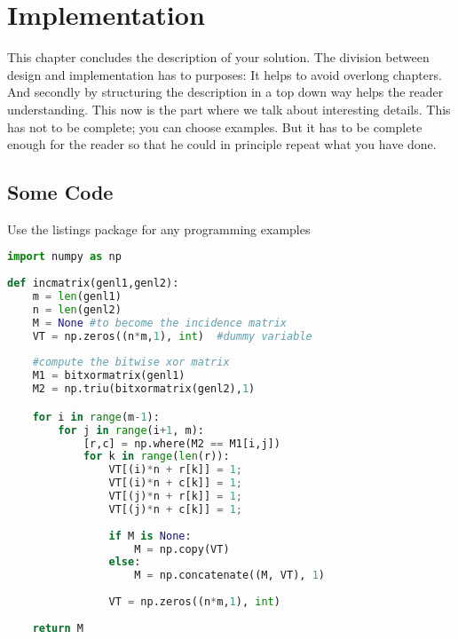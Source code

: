 \chapter{Implementation} 
\label{Chapter4} 

This chapter concludes the description of your solution.
The division between design and implementation has to purposes:
It helps to avoid overlong chapters. And secondly by structuring the 
description in a top down way helps the reader understanding.
This now is the part where we talk about interesting details.
This has not to be complete; you can choose examples.
But it has to be complete enough for the reader so that he
could in principle repeat what you have done.



\section{Some Code}

Use the listings package for any programming examples


\begin{lstlisting}[language=Python,caption={A python listing}]
import numpy as np
    
def incmatrix(genl1,genl2):
    m = len(genl1)
    n = len(genl2)
    M = None #to become the incidence matrix
    VT = np.zeros((n*m,1), int)  #dummy variable
    
    #compute the bitwise xor matrix
    M1 = bitxormatrix(genl1)
    M2 = np.triu(bitxormatrix(genl2),1) 

    for i in range(m-1):
        for j in range(i+1, m):
            [r,c] = np.where(M2 == M1[i,j])
            for k in range(len(r)):
                VT[(i)*n + r[k]] = 1;
                VT[(i)*n + c[k]] = 1;
                VT[(j)*n + r[k]] = 1;
                VT[(j)*n + c[k]] = 1;
                
                if M is None:
                    M = np.copy(VT)
                else:
                    M = np.concatenate((M, VT), 1)
                
                VT = np.zeros((n*m,1), int)
    
    return M
\end{lstlisting}



